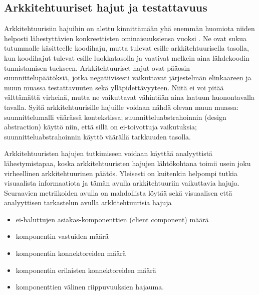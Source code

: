 \documentclass[finnish]{tktltiki2}
\numberwithin{table}{section}
\theoremstyle{definition}
\theoremstyle{remark}
\begin{document}




\subsection{Arkkitehtuuriset hajut ja testattavuus} \label{arch_smells_and_testability}

Arkkitehtuurisiin hajuihin on alettu kinnittämään yhä enemmän huomiota niiden helposti lähestyttävien konkreettisten ominaisuuksiensa vuoksi \citep{de_andrade_architectural_2014}. Ne ovat sukua tutummalle käsitteelle koodihaju, mutta tulevat esille arkkitehtuurisella tasolla, kun koodihajut tulevat esille luokkatasolla ja vaativat melkein aina lähdekoodin tunnistamisen tuekseen. Arkkitehtuuriset hajut ovat pääosin suunnittelupäätöksiä, jotka negatiivisesti vaikuttavat järjestelmän elinkaareen ja muun muassa testattavuuten sekä ylläpidettävyyteen. Niitä ei voi pitää välttämättä virheinä, mutta ne vaikuttavat vähintään aina laatuun huonontavalla tavalla. Syitä arkkitehtuurisille hajuille voidaan nähdä olevan muun muassa: suunnittelumalli väärässä kontekstissa;  suunnitteluabstrahoinnin (design abstraction) käyttö niin, että sillä on ei-toivottuja vaikutuksia; suunnitteluabstrahoinnin käyttö väärällä tarkkuuden tasolla.

Arkkitehtuuristen hajujen tutkimiseen voidaan käyttää analyyttistä lähestymistapaa, koska arkkitehtuuristen hajujen lähtökohtana toimii usein joku virheellinen arkkitehtuurinen päätös. Yleisesti on kuitenkin helpompi tutkia visuaalista informaatiota ja tämän avulla arkkitehtuuriin vaikuttavia hajuja. Seuraavien metriikoiden avulla on mahdollista löytää sekä visuaalisen että analyyttisen tarkastelun avulla arkkitehtuurisia hajuja \citep{bertran_detecting_2011}

\begin{itemize}
	\item ei-haluttujen asiakas-komponenttien (client component) määrä
	\item komponentin vastuiden määrä
	\item komponentin konnektoreiden määrä
	\item komponentin erilaisten konnektoreiden määrä
	\item komponenttien välinen riippuvuuksien hajauma.
\end{itemize}
\end{document}
